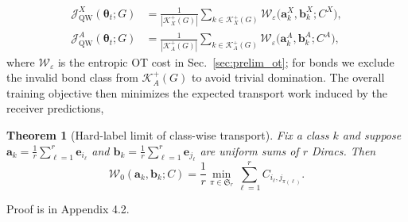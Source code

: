 \documentclass[journal,twoside,web]{ieeecolor}
\newtheorem{theorem}{Theorem}
\begin{document}
\begin{align}
\mathcal{J}^{X}_{\mathrm{QW}}(\boldsymbol{\theta}_t;G)
&=
\frac{1}{|\mathcal{K}_X^{+}(G)|}
\sum_{k\in\mathcal{K}_X^{+}(G)}
\!\mathcal{W}_{\varepsilon}\!\big(\mathbf{a}_k^X,\mathbf{b}_k^X;C^{X}\big),
\label{eq:qw_X}
\\
\mathcal{J}^{A}_{\mathrm{QW}}(\boldsymbol{\theta}_t;G)
&=
\frac{1}{|\mathcal{K}_A^{+}(G)|}
\sum_{k\in\mathcal{K}_A^{+}(G)}
\!\mathcal{W}_{\varepsilon}\!\big(\mathbf{a}_k^A,\mathbf{b}_k^A;C^{A}\big),
\label{eq:qw_A}
\end{align}
where $\mathcal{W}_{\varepsilon}$ is the entropic OT cost in Sec.~\ref{sec:prelim_ot}; for bonds we exclude the  invalid bond class from $\mathcal{K}_A^{+}(G)$ to avoid trivial domination. The overall training objective then minimizes the expected transport work induced by the receiver predictions, 

\begin{theorem}[Hard-label limit of class-wise transport]
\label{thm:em}
Fix a class $k$ and suppose $\mathbf{a}_k=\frac{1}{r}\sum_{\ell=1}^{r}\mathbf{e}_{i_\ell}$ and $\mathbf{b}_k=\frac{1}{r}\sum_{\ell=1}^{r}\mathbf{e}_{j_\ell}$ are uniform sums of $r$ Diracs. Then
\[
\mathcal{W}_{0}(\mathbf{a}_k,\mathbf{b}_k;C)
=
\frac{1}{r}\min_{\pi\in\mathfrak{S}_r}\sum_{\ell=1}^{r} C_{i_\ell,j_{\pi(\ell)}}.
\]
\end{theorem}
Proof is in Appendix 4.2.
\end{document}
